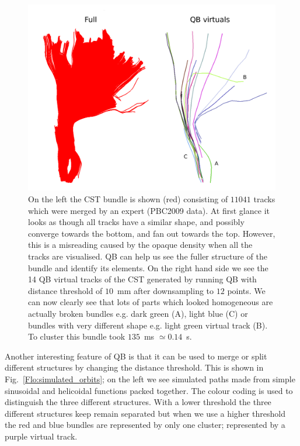 \documentclass[preprint,authoryear,a4paper,10pt,onecolumn]{elsarticle}
\begin{document}
%
\begin{figure}
\begin{centering}
\includegraphics[scale=0.3]{last_figures/cst_simplification}
\par\end{centering}
\caption{On the left the CST bundle is shown (red) consisting of $11041$
  tracks which were merged by an expert (PBC2009 data). At first glance
  it looks as though all tracks have a similar shape, and possibly
  converge towards the bottom, and fan out towards the top. However,
  this is a misreading caused by the opaque density when all the tracks
  are visualised.  QB can help us see the fuller structure of the bundle
  and identify its elements. On the right hand side we see the 14 QB
  virtual tracks of the CST generated by running QB with distance
  threshold of $10$~mm after downsampling to $12$ points. We can now
  clearly see that lots of parts which looked homogeneous are actually
  broken bundles e.g. dark green (A), light blue (C) or bundles with
  very different shape e.g. light green virtual track (B). To cluster
  this bundle took $135$~ms $\simeq0.14$~s.\label{Flo:cst_pbc}}
\end{figure}

Another interesting feature of QB is that it can be used to merge
or split different structures by changing the distance threshold.
This is shown in Fig.~\ref{Flo:simulated_orbits}; on the left we
see simulated paths made from simple sinusoidal and helicoidal functions
packed together. The colour coding is used to distinguish the three
different structures. With a lower threshold the three different structures
keep remain separated but when we use a higher threshold the red and
blue bundles are represented by only one cluster; represented by a
purple virtual track.
\end{document}
